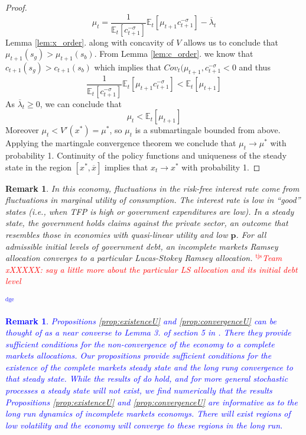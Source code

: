 \documentclass[12pt]{article}
\newcommand{\dge}[1]{\textcolor{blue}{$^{\textrm{dge}}${#1}}}
\newcommand{\tjs}[1]{\textcolor{red}{$^{\textrm{tjs}}${#1}}}
\newcommand{\EE}{\mathbb E}
\newtheorem{remark}[theorem]{Remark}
\begin{document}
\begin{proof}
{\[
	 \mu_t = \frac{1}{\EE_t[c_{t+1}^{-\sigma}]}\EE_t[\mu_{t+1}c_{t+1}^{-\sigma}] -\overline \lambda_t
\]  Lemma  \ref{lem:x_order}. along with concavity of $V$ allows us to conclude that $\mu_{t+1}(s_g) > \mu_{t+1}(s_b)$.  From Lemma \ref{lem:c_order}. we know that $c_{t+1}(s_g) > c_{t+1}(s_b)$ which implies that $Cov_t(\mu_{t+1},c_{t+1}^{-\sigma} <0$ and thus
\[
	 \frac{1}{\EE_t[c_{t+1}^{-\sigma}]}\EE_t[\mu_{t+1}c_{t+1}^{-\sigma}]  < \EE_t[\mu_{t+1}]
\]  As $\overline \lambda_t \geq 0$, we can conclude that 
\[
	\mu_t < \EE_t[\mu_{t+1}]
\]  Moreover $\mu_t < V'(x^*) = \mu^*$, so $\mu_t$ is a submartingale bounded from above.  Applying the martingale convergence theorem we conclude that $\mu_t \rightarrow \mu^*$ with probability 1.  Continuity of the policy functions and uniqueness of the steady state in the region $[x^*,\overline x]$ implies that $x_t\rightarrow x^*$ with probability 1.}
\end{proof}

\begin{remark}
In this economy,  fluctuations in the risk-free  interest rate come from fluctuations in  marginal utility of consumption. The interest rate
 is low  in ``good'' states (i.e., when  TFP is high or government expenditures are low).
 In a steady state, the government holds claims against the private sector, an outcome that resembles those in economies
 with  quasi-linear utility and  low  $\bm{p}$.  For all admissible  initial  levels of government debt, an incomplete markets Ramsey allocation converges to a particular Lucas-Stokey  Ramsey allocation. \tjs{Team xXXXXX: say a little more about the particular LS allocation and its initial debt level}   	


\end{remark}
\dge{
\begin{remark}  Propositions \ref{prop:existenceU}  and \ref{prop:convergenceU} can be thought of as a near converse to Lemma 3. of section 5 in \citet{Aiyagari2002}.  There they provide sufficient conditions for the non-convergence of the economy to a complete markets allocations.  Our propositions provide sufficient conditions for the existence of the complete markets steady state and the long rung convergence to that steady state.  While the results of \citet{Aiyagari2002} do hold, and for more general stochastic processes a steady state will not exist, we find numerically that the results Propositions \ref{prop:existenceU}  and \ref{prop:convergenceU} are informative as to the long run dynamics of incomplete markets economys.  There will exist regions of low volatility and the economy will converge to these regions in the long run.
\end{remark}}
\end{document}
